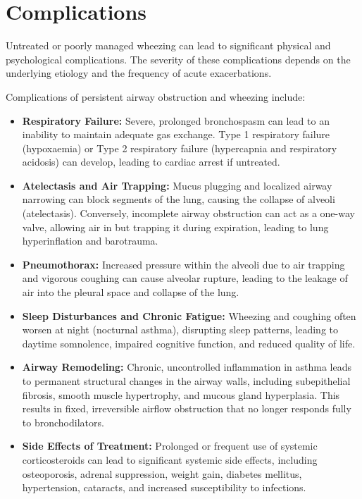 \section*{Complications}
Untreated or poorly managed wheezing can lead to significant physical and psychological complications. The severity of these complications depends on the underlying etiology and the frequency of acute exacerbations.

Complications of persistent airway obstruction and wheezing include:
\begin{itemize}
    \item \textbf{Respiratory Failure:} Severe, prolonged bronchospasm can lead to an inability to maintain adequate gas exchange. Type 1 respiratory failure (hypoxaemia) or Type 2 respiratory failure (hypercapnia and respiratory acidosis) can develop, leading to cardiac arrest if untreated.
    \item \textbf{Atelectasis and Air Trapping:} Mucus plugging and localized airway narrowing can block segments of the lung, causing the collapse of alveoli (atelectasis). Conversely, incomplete airway obstruction can act as a one-way valve, allowing air in but trapping it during expiration, leading to lung hyperinflation and barotrauma.
    \item \textbf{Pneumothorax:} Increased pressure within the alveoli due to air trapping and vigorous coughing can cause alveolar rupture, leading to the leakage of air into the pleural space and collapse of the lung.
    \item \textbf{Sleep Disturbances and Chronic Fatigue:} Wheezing and coughing often worsen at night (nocturnal asthma), disrupting sleep patterns, leading to daytime somnolence, impaired cognitive function, and reduced quality of life.
    \item \textbf{Airway Remodeling:} Chronic, uncontrolled inflammation in asthma leads to permanent structural changes in the airway walls, including subepithelial fibrosis, smooth muscle hypertrophy, and mucous gland hyperplasia. This results in fixed, irreversible airflow obstruction that no longer responds fully to bronchodilators.
    \item \textbf{Side Effects of Treatment:} Prolonged or frequent use of systemic corticosteroids can lead to significant systemic side effects, including osteoporosis, adrenal suppression, weight gain, diabetes mellitus, hypertension, cataracts, and increased susceptibility to infections.
\end{itemize}

